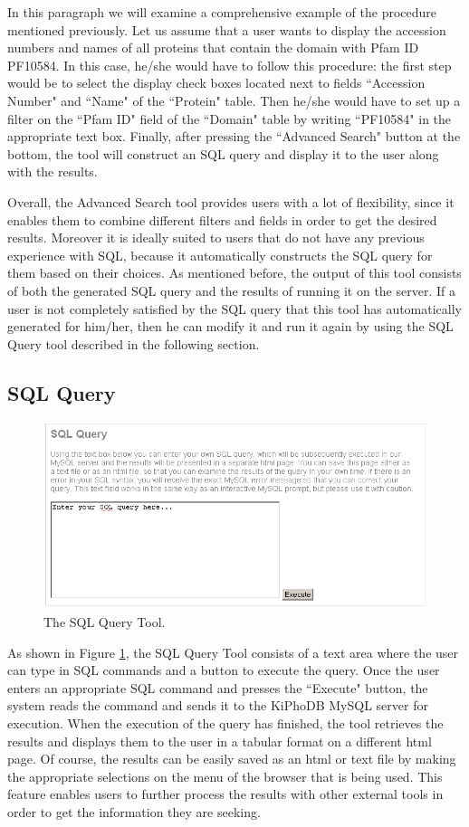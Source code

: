 In this paragraph we will examine a comprehensive example of the procedure mentioned previously.
Let us assume that a user wants to display the accession numbers and names of all proteins that contain the domain with Pfam ID PF10584.
In this case, he/she would have to follow this procedure:
the first step would be to select the display check boxes located next to fields ``Accession Number" and ``Name" of the ``Protein" table.
Then he/she would have to set up a filter on the ``Pfam ID" field of the ``Domain" table by writing ``PF10584" in the appropriate text box.
Finally, after pressing the ``Advanced Search" button at the bottom, the tool will construct an SQL query and display it to the user along with the results.

Overall, the Advanced Search tool provides users with a lot of flexibility, since it enables them to combine different filters and fields in order to get the desired results.
Moreover it is ideally suited to users that do not have any previous experience with SQL, because it automatically constructs the SQL query for them based on their choices.
As mentioned before, the output of this tool consists of both the generated SQL query and the results of running it on the server.
If a user is not completely satisfied by the SQL query that this tool has automatically generated for him/her, then he can modify it and run it again by using the SQL Query tool described in the following section.

\subsection{SQL Query}
\begin{figure}[htp]
\centering
\includegraphics[scale=0.6]{pictures/SQLQueryTool.png}
\caption{The SQL Query Tool.}
\label{sqlquerytool}
\end{figure}
As shown in Figure \ref{sqlquerytool}, the SQL Query Tool consists of a text area where the user can type in SQL commands and a button to execute the query.
Once the user enters an appropriate SQL command and presses the ``Execute" button, the system reads the command and sends it to the KiPhoDB MySQL server for execution.
When the execution of the query has finished, the tool retrieves the results and displays them to the user in a tabular format on a different html page.
Of course, the results can be easily saved as an html or text file by making the appropriate selections on the menu of the browser that is being used.
This feature enables users to further process the results with other external tools in order to get the information they are seeking.

